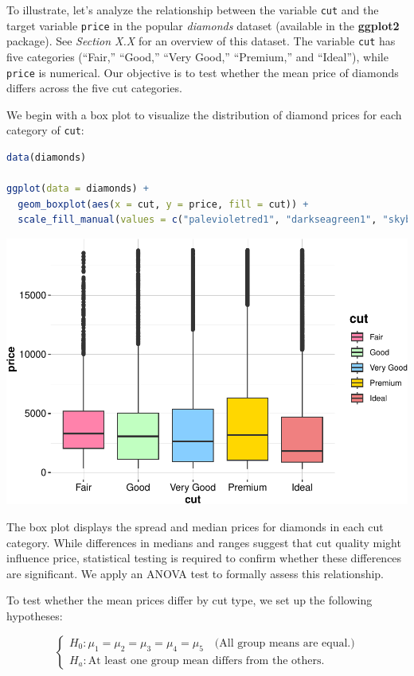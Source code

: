 \documentclass[
]{book}
\newcommand{\passthrough}[1]{#1}
\theoremstyle{definition}
\theoremstyle{definition}
\theoremstyle{definition}
\theoremstyle{definition}
\theoremstyle{remark}
\begin{document}
To illustrate, let's analyze the relationship between the variable \passthrough{\lstinline!cut!} and the target variable \passthrough{\lstinline!price!} in the popular \emph{diamonds} dataset (available in the \textbf{ggplot2} package). See \emph{Section X.X} for an overview of this dataset. The variable \passthrough{\lstinline!cut!} has five categories (``Fair,'' ``Good,'' ``Very Good,'' ``Premium,'' and ``Ideal''), while \passthrough{\lstinline!price!} is numerical. Our objective is to test whether the mean price of diamonds differs across the five cut categories.

We begin with a box plot to visualize the distribution of diamond prices for each category of \passthrough{\lstinline!cut!}:

\begin{lstlisting}[language=R]
data(diamonds)   

ggplot(data = diamonds) + 
  geom_boxplot(aes(x = cut, y = price, fill = cut)) +
  scale_fill_manual(values = c("palevioletred1", "darkseagreen1", "skyblue1", "gold1", "lightcoral"))
\end{lstlisting}

\begin{center}\includegraphics[width=0.7\linewidth]{statistics_files/figure-latex/unnamed-chunk-16-1} \end{center}

The box plot displays the spread and median prices for diamonds in each cut category. While differences in medians and ranges suggest that cut quality might influence price, statistical testing is required to confirm whether these differences are significant. We apply an ANOVA test to formally assess this relationship.

To test whether the mean prices differ by cut type, we set up the following hypotheses:

\[
\begin{cases}
    H_0: \mu_1 = \mu_2 = \mu_3 = \mu_4 = \mu_5 \quad \text{(All group means are equal.)} \\
    H_a: \text{At least one group mean differs from the others.}  
\end{cases}
\]
\end{document}
